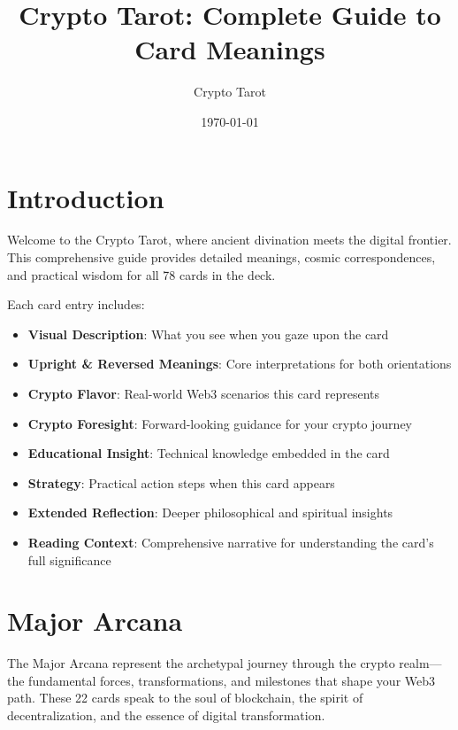 \documentclass[11pt,oneside]{book}
\begin{document}
\title{Crypto Tarot: Complete Guide to Card Meanings}
\author{Crypto Tarot}
\date{\today}
\maketitle

\frontmatter
\tableofcontents
\mainmatter

\chapter*{Introduction}

Welcome to the Crypto Tarot, where ancient divination meets the digital frontier. This comprehensive guide provides detailed meanings, cosmic correspondences, and practical wisdom for all 78 cards in the deck.

Each card entry includes:

\begin{itemize}
\item \textbf{Visual Description}: What you see when you gaze upon the card
\item \textbf{Upright \& Reversed Meanings}: Core interpretations for both orientations
\item \textbf{Crypto Flavor}: Real-world Web3 scenarios this card represents
\item \textbf{Crypto Foresight}: Forward-looking guidance for your crypto journey
\item \textbf{Educational Insight}: Technical knowledge embedded in the card
\item \textbf{Strategy}: Practical action steps when this card appears
\item \textbf{Extended Reflection}: Deeper philosophical and spiritual insights
\item \textbf{Reading Context}: Comprehensive narrative for understanding the card's full significance
\end{itemize}

\chapter*{Major Arcana}

The Major Arcana represent the archetypal journey through the crypto realm—the fundamental forces, transformations, and milestones that shape your Web3 path. These 22 cards speak to the soul of blockchain, the spirit of decentralization, and the essence of digital transformation.
\end{document}
